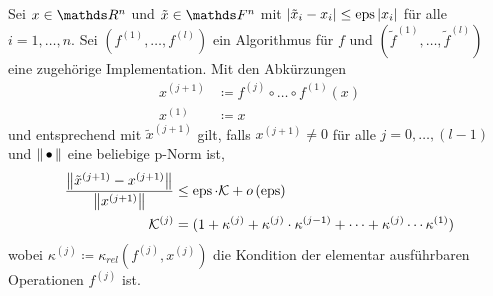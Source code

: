 \begin{Leme}[Fehlerfortpflanzung]
  \label{3.3.5} 
  Sei $x\in \Ren$ und $\tilde{x}\in \F^n$ 
  mit $|\tilde{x}_i-x_i|\leq \operatorname{eps}|x_i|$ für alle $i=1,\dotsc , n$.
  Sei $\left(f^{(1)},\dotsc ,f^{(l)}\right)$ ein Algorithmus für $f$ und 
  $(\widetilde{f}^{(1)},\dotsc ,\widetilde{f}^{(l)})$ 
  eine zugehörige Implementation.
  Mit den Abkürzungen
  \begin{align*}
    x^{(j+1)} &\coloneqq f^{(j)}\circ \dotsc \circ f^{(1)}(x) \\
    x^{(1)} &\coloneqq x
  \end{align*}
  und entsprechend mit $\tilde{x}^{(j+1)}$ gilt,
  falls $x^{(j+1)} \neq 0$ für alle $j=0,\dotsc , (l-1)$ 
  und $\left\| \,\bullet\, \right\|$ eine beliebige p-Norm ist,
  \begin{align}
    \frac{\nn[\tilde{x}^{(j+1)}-x^{(j+1)}]}{\nn[x^{(j+1)}]}
    &\leq \Eps \cdot \K + o\left(\Eps\right)
      \label{III.3.4} 
    \\ \nonumber
    \K^{(j)} &=(1+\kappa^{(j)}+\kappa^{(j)}\cdot \kappa^{(j-1)}
               + \dotsb
               + \kappa^{(j)}\dotsm\kappa^{(1)})
  \end{align}
  wobei $\kappa^{(j)} \coloneqq \kappa_{rel}(f^{(j)}, x^{(j)})$
  die Kondition der elementar ausführbaren Operationen $f^{(j)}$ ist.


\end{Leme}
